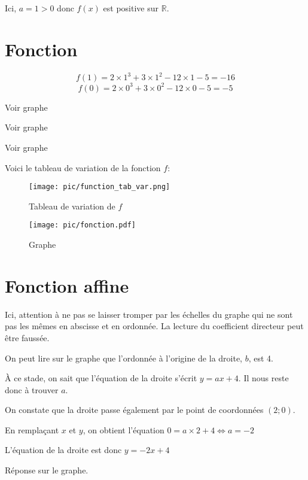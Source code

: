 \documentclass[a4paper,11pt]{scrartcl}
\begin{document}
Ici, $a = 1 > 0$ donc $f(x)$ est positive sur $\mathbb{R}$.

\section*{Fonction}

\question{}

$$f(1) = 2 \times 1^3 + 3 \times 1^2 - 12 \times 1 - 5 = -16$$ 
$$f(0) = 2 \times 0^3 + 3 \times 0^2 - 12 \times 0 - 5 = -5$$

\question{}
Voir graphe

\question{}
Voir graphe

\question{}
Voir graphe

\question{}

Voici le tableau de variation de la fonction $f$:

\begin{figure}
\begin{center}
\texttt{[image: pic/function\_tab\_var.png]}
\end{center}
\caption{Tableau de variation de $f$}
\end{figure}


\begin{figure}
\texttt{[image: pic/fonction.pdf]}
\label{graphReponse}
\caption{Graphe}
\end{figure}

\section*{Fonction affine}

\exo{}

\question{}
Ici, attention à ne pas se laisser tromper par les échelles du graphe qui ne sont pas les mêmes en abscisse et en ordonnée. La lecture du coefficient directeur peut être faussée.

On peut lire sur le graphe que l'ordonnée à l'origine de la droite, $b$, est 4.

À ce stade, on sait que l'équation de la droite s'écrit $y = ax+4$. Il nous reste donc à trouver $a$.

On constate que la droite passe également par le point de coordonnées $(2;0)$.

En remplaçant $x$ et $y$, on obtient l'équation $0 = a \times 2 + 4 \Leftrightarrow a = -2$

L'équation de la droite est donc $y = -2x+4$

\question{}
Réponse sur le graphe.
\end{document}
